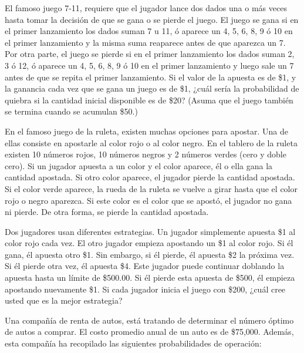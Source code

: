 \documentclass[11pt,letterpaper]{report}
\begin{document}
\begin{description}[leftmargin=1.2cm,style=nextline]

\item[5.1.] El famoso juego 7-11, requiere que el jugador lance dos dados
una o más veces hasta tomar la decisión de que se gana o se pierde el juego.
El juego se gana si en el primer lanzamiento los dados suman 7 u 11, ó
aparece un 4, 5, 6, 8, 9 ó 10 en el primer lanzamiento y la misma suma
reaparece antes de que aparezca un 7. Por otra parte, el juego se pierde si
en el primer lanzamiento los dados suman 2, 3 ó 12, ó aparece un 4, 5, 6, 8,
9 ó 10 en el primer lanzamiento y luego sale un 7 antes de que se repita el
primer lanzamiento. Si el valor de la apuesta es de \$1, y la ganancia cada
vez que se gana un juego es de \$1, ¿cuál sería la probabilidad de quiebra si
la cantidad inicial disponible es de \$20? (Asuma que el juego también se
termina cuando se acumulan \$50.)

\item[5.2.] En el famoso juego de la ruleta, existen muchas opciones para
apostar. Una de ellas consiste en apostarle al color rojo o al color negro.
En el tablero de la ruleta existen 10 números rojos, 10 números negros y 2
números verdes (cero y doble cero). Si un jugador apuesta a un color y el
color aparece, él o ella gana la cantidad apostada. Si otro color aparece,
el jugador pierde la cantidad apostada. Si el color verde aparece, la rueda
de la ruleta se vuelve a girar hasta que el color rojo o negro aparezca. Si
este color es el color que se apostó, el jugador no gana ni pierde. De otra
forma, se pierde la cantidad apostada.

Dos jugadores usan diferentes estrategias. Un jugador simplemente apuesta \$1
al color rojo cada vez. El otro jugador empieza apostando un \$1 al color
rojo. Si él gana, él apuesta otro \$1. Sin embargo, si él pierde, él apuesta
\$2 la próxima vez. Si él pierde otra vez, él apuesta \$4. Este jugador puede
continuar doblando la apuesta hasta un límite de \$500.00. Si él pierde esta
apuesta de \$500, él empieza apostando nuevamente \$1. Si cada jugador inicia
el juego con \$200, ¿cuál cree usted que es la mejor estrategia?

\item[5.3.] Una compañía de renta de autos, está tratando de determinar el
número óptimo de autos a comprar. El costo promedio anual de un auto es de
\$75,000. Además, esta compañía ha recopilado las siguientes probabilidades
de operación:


\end{description}
\end{document}
